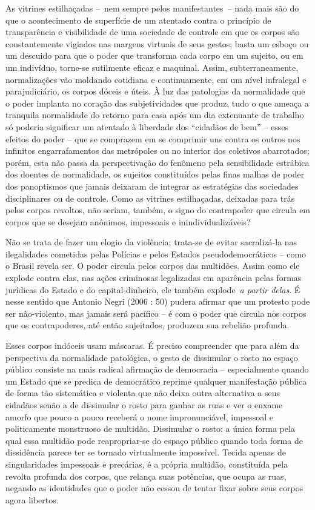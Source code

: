 As vitrines estilhaçadas --~nem sempre pelos manifestantes~-- nada mais
são do que o acontecimento de superfície de um atentado contra o
princípio de transparência e visibilidade de uma sociedade de controle
em que os corpos são constantemente vigiados nas margens virtuais de
seus gestos; basta um esboço ou um descuido para que o poder que
transforma cada corpo em um sujeito, ou em um indivíduo, torne-se
sutilmente eficaz e maquinal. Assim, subterraneamente, normalizações vão
moldando cotidiana e continuamente, em um nível infralegal e
parajudiciário, os corpos dóceis e úteis. À luz das patologias da
normalidade que o poder implanta no coração das subjetividades que
produz, tudo o que ameaça a tranquila normalidade do retorno para casa
após um dia extenuante de trabalho só poderia significar um atentado à
liberdade dos ``cidadãos de bem'' -- esses efeitos do poder -- que se
comprazem em se comprimir uns contra os outros nos infinitos
engarrafamentos das metrópoles ou no interior dos coletivos abarrotados;
porém, esta não passa da perspectivação do fenômeno pela sensibilidade
estrábica dos doentes de normalidade, os sujeitos constituídos pelas
finas malhas de poder dos panoptismos que jamais deixaram de integrar as
estratégias das sociedades disciplinares ou de controle. Como as
vitrines estilhaçadas, deixadas para trás pelos corpos revoltos, não
seriam, também, o signo do contrapoder que circula em corpos que se
desejam anônimos, impessoais e inindividualizáveis?

Não se trata de fazer um elogio da violência; trata-se de evitar
sacralizá-la nas ilegalidades cometidas pelas Polícias e pelos Estados
pseudodemocráticos -- como o Brasil revela ser. O poder circula pelos
corpos das multidões. Assim como ele explode contra elas, nas ações
criminosas legalizadas em aparência pelas formas jurídicas do Estado e
do capital-dinheiro, ele também explode~\emph{a partir delas}. É nesse
sentido que Antonio Negri (2006 : 50) pudera afirmar que um protesto
pode ser não-violento, mas jamais será pacífico -- é com o poder que
circula nos corpos que os contrapoderes, até então sujeitados, produzem
sua rebelião profunda.

Esses corpos indóceis usam máscaras. É preciso compreender que para além
da perspectiva da normalidade patológica, o gesto de dissimular o rosto
no espaço público consiste na mais radical afirmação de democracia --
especialmente quando um Estado que se predica de democrático reprime
qualquer manifestação pública de forma tão sistemática e violenta que
não deixa outra alternativa a seus cidadãos senão a de dissimular o
rosto para ganhar as ruas e ver o enxame amorfo que pouco a pouco
receberá o nome impronunciável, impessoal e politicamente monstruoso de
multidão. Dissimular o rosto: a única forma pela qual essa multidão pode
reapropriar-se do espaço público quando toda forma de dissidência parece
ter se tornado virtualmente impossível. Tecida apenas de singularidades
impessoais e precárias, é a própria multidão, constituída pela revolta
profunda dos corpos, que relança suas potências, que ocupa as ruas,
negando as identidades que o poder não cessou de tentar fixar sobre seus
corpos agora libertos.

